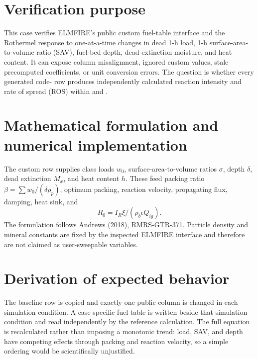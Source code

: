 \section{Verification purpose}

This case verifies ELMFIRE's public custom fuel-table interface and the Rothermel response to one-at-a-time changes in dead 1-h load, 1-h surface-area-to-volume ratio (SAV), fuel-bed depth, dead extinction moisture, and heat content.  It can expose column misalignment, ignored custom values, stale precomputed coefficients, or unit conversion errors.  The question is whether every generated code-\CustomFuelCode{} row produces independently calculated reaction intensity and rate of spread (ROS) within \IrTolerance{} and \RosTolerance{}.

\section{Mathematical formulation and numerical implementation}
The custom row supplies class loads $w_0$, surface-area-to-volume ratios $\sigma$, depth $\delta$, dead extinction $M_x$, and heat content $h$.  These feed packing ratio $\beta=\sum w_0/(\delta\rho_p)$, optimum packing, reaction velocity, propagating flux, damping, heat sink, and
\begin{equation}R_0=I_R\xi/(\rho_b\epsilon Q_{ig}).\end{equation}
The formulation follows Andrews (2018), RMRS-GTR-371.  Particle density and mineral constants are fixed by the inspected ELMFIRE interface and therefore are not claimed as user-sweepable variables.

\section{Derivation of expected behavior}
The baseline row is copied and exactly one public column is changed in each simulation condition.  A case-specific fuel table is written beside that simulation condition and read independently by the reference calculation.  The full equation is recalculated rather than imposing a monotonic trend: load, SAV, and depth have competing effects through packing and reaction velocity, so a simple ordering would be scientifically unjustified.

